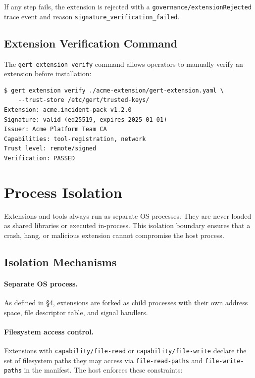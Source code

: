 If any step fails, the extension is rejected with a
\texttt{governance/extensionRejected} trace event and reason
\texttt{signature\_verification\_failed}.

\subsection{Extension Verification Command}

The \texttt{gert extension verify} command allows operators to manually verify
an extension before installation:

\begin{verbatim}
$ gert extension verify ./acme-extension/gert-extension.yaml \
    --trust-store /etc/gert/trusted-keys/
Extension: acme.incident-pack v1.2.0
Signature: valid (ed25519, expires 2025-01-01)
Issuer: Acme Platform Team CA
Capabilities: tool-registration, network
Trust level: remote/signed
Verification: PASSED
\end{verbatim}

\section{Process Isolation}
\label{sec:process-isolation}

Extensions and tools always run as separate OS processes.  They are never
loaded as shared libraries or executed in-process.  This isolation boundary
ensures that a crash, hang, or malicious extension cannot compromise the host
process.

\subsection{Isolation Mechanisms}

\paragraph{Separate OS process.}
As defined in §4, extensions are forked as child processes with their own
address space, file descriptor table, and signal handlers.

\paragraph{Filesystem access control.}
Extensions with \texttt{capability/file-read} or \texttt{capability/file-write}
declare the set of filesystem paths they may access via
\texttt{file-read-paths} and \texttt{file-write-paths} in the manifest.  The
host enforces these constraints:

